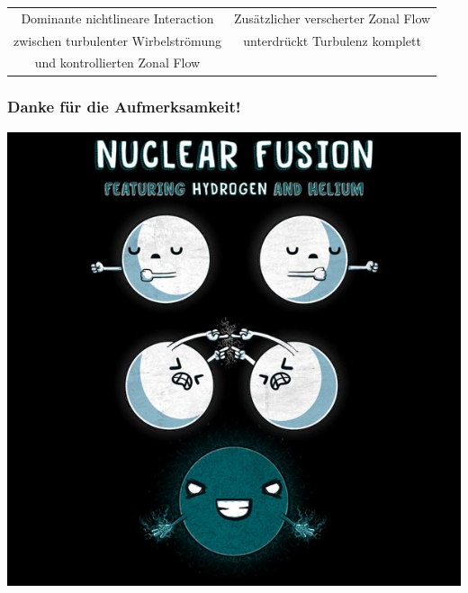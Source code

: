 \documentclass[compress,aspectratio=169]{beamer}
\begin{document}
\begin{frame}
\begin{tabular}{c c}
			Dominante nichtlineare Interaction  & Zusätzlicher verscherter Zonal Flow \\
			zwischen turbulenter Wirbelströmung & unterdrückt Turbulenz komplett \\
			und kontrollierten Zonal Flow & \\
		\end{tabular}
	\end{frame}


	\begin{frame}
		\frametitle{Danke für die Aufmerksamkeit!}
		\includegraphics[scale = 0.35]{pictures/Fusion_Meme.jpeg} \\
	\end{frame}
\end{document}
